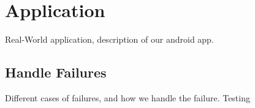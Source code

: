 \section{Application}
\label{sec:application}
Real-World application, description of our android app.

\subsection{Handle Failures}
Different cases of failures, and how we handle the failure.
Testing


